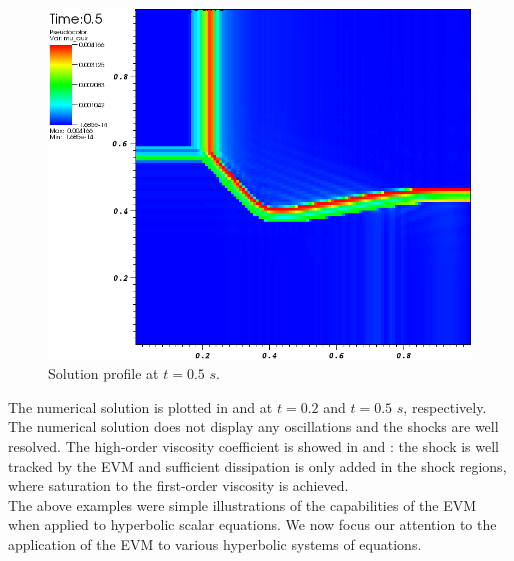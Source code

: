 \begin{figure}[H]
	\centering
	\includegraphics[width=\textwidth]{figures/Burger2D_visc_t0p5.png}
	\caption{Solution profile at $t=0.5$ $s$.}
	\label{fig:2d_burger_visc_t0p5}
\end{figure}
%
The numerical solution is plotted in  and  at $t=0.2$ and $t=0.5$ $s$, respectively. The numerical solution does not display any oscillations and the shocks are well resolved. The high-order viscosity coefficient is showed in  and : the shock is well tracked by the EVM and sufficient dissipation is only added in the shock regions, where saturation to the first-order viscosity is achieved.\\

The above examples were simple illustrations of the capabilities of the EVM when applied to hyperbolic scalar equations. We now focus our attention to the application of the EVM to various hyperbolic systems of equations.